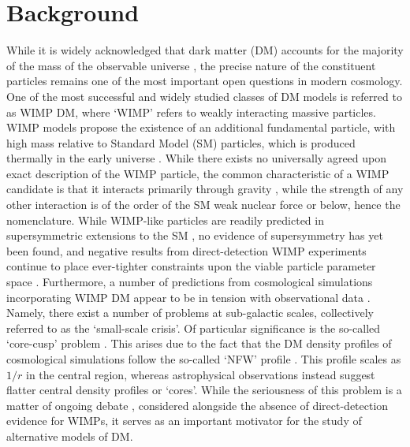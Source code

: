 \section{Background}

While it is widely acknowledged that dark matter (DM)  accounts for the majority of the mass of the observable universe \cite{Ade:2015xua},  the precise nature of the constituent particles remains one of the most important open questions in modern cosmology. One of the most successful and widely studied classes of DM models is referred to as WIMP DM, where `WIMP' refers to weakly interacting massive particles. WIMP models propose the existence of an additional fundamental particle, with high mass relative to Standard Model (SM) particles, which is produced thermally in the early universe \cite{Roszkowski:2017nbc}. While there exists no universally agreed upon exact description of the WIMP particle, the common characteristic of a WIMP candidate is that it interacts primarily through gravity , while the strength of any other interaction is of the order of the SM weak nuclear force or below, hence the nomenclature. While WIMP-like particles are readily predicted in supersymmetric extensions to the SM \cite{Chang:2013oia}, no evidence of supersymmetry has yet been found, and negative results from direct-detection WIMP experiments continue to place ever-tighter constraints upon the viable particle parameter space \cite{Cui:2017nnn}. Furthermore, a number of predictions from cosmological simulations incorporating WIMP DM appear to be in tension with observational data \cite{Bullock:2017xww}. Namely, there exist a number of problems at sub-galactic scales, collectively referred to as the `small-scale crisis'. Of particular significance is the so-called `core-cusp' problem \cite{Moore:1994yx}. This arises due to the fact that the DM density profiles of cosmological simulations follow the so-called `NFW' profile \cite{Navarro:1995iw}. This profile scales as $1/r$ in the central region, whereas astrophysical observations instead suggest flatter central density profiles or `cores'. While the seriousness of this problem is a matter of ongoing debate \cite{anna2018}, considered alongside the absence of direct-detection evidence for WIMPs, it serves as an important motivator for the study of alternative models of DM.  

